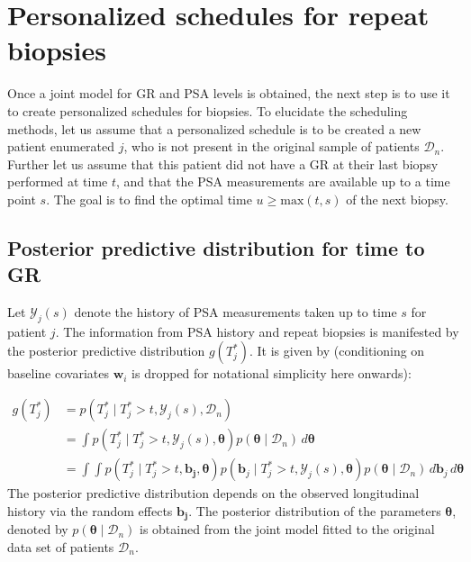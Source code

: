
\section{Personalized schedules for repeat biopsies}
\label{sec : pers_sched_approaches}
Once a joint model for GR and PSA levels is obtained, the next step is to use it to create personalized schedules for biopsies. To elucidate the scheduling methods, let us assume that a personalized schedule is to be created a new patient enumerated $j$, who is not present in the original sample of patients $\mathcal{D}_n$. Further let us assume that this patient did not have a GR at their last biopsy performed at time $t$, and that the PSA measurements are available up to a time point $s$. The goal is to find the optimal time $u \geq \text{max}(t,s)$ of the next biopsy.

\subsection{Posterior predictive distribution for time to GR}
\label{subsec : ppd_time_to_GR}
Let $\mathcal{Y}_j(s)$ denote the history of PSA measurements taken up to time $s$ for patient $j$. The information from PSA history and repeat biopsies is manifested by the posterior predictive distribution $g(T^*_j)$. It is given by (conditioning on baseline covariates $\boldsymbol{w}_i$ is dropped for notational simplicity here onwards):

\begin{equation}
\label{eq : dyn_dist_fail_time}
\begin{split}
g(T^*_j) &= p(T^*_j \mid T^*_j > t, \mathcal{Y}_j(s), \mathcal{D}_n)\\
&= \int p(T^*_j \mid T^*_j > t, \mathcal{Y}_j(s), \boldsymbol{\theta}) p(\boldsymbol{\theta} \mid \mathcal{D}_n) \,d\boldsymbol{\theta}\\
&= \int \int p(T^*_j \mid T^*_j > t, \boldsymbol{b_j}, \boldsymbol{\theta}) p(\boldsymbol{b}_j \mid T^*_j>t, \mathcal{Y}_j(s), \boldsymbol{\theta})p(\boldsymbol{\theta} \mid \mathcal{D}_n) \,d\boldsymbol{b}_j \,d\boldsymbol{\theta}
\end{split}
\end{equation}
The posterior predictive distribution depends on the observed longitudinal history via the random effects $\boldsymbol{b_j}$. The posterior distribution of the parameters $\boldsymbol{\theta}$, denoted by $p(\boldsymbol{\theta} \mid \mathcal{D}_n)$ is obtained from the joint model fitted to the original data set of patients $\mathcal{D}_n$.

